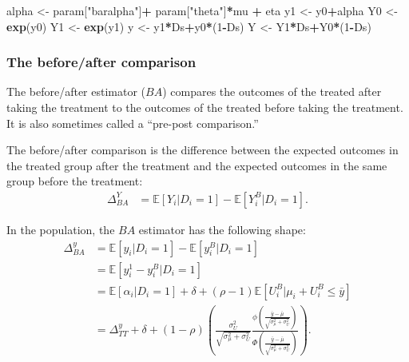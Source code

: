 \documentclass[]{book}
\newenvironment{Shaded}{\begin{snugshade}}{\end{snugshade}}
\newcommand{\DecValTok}[1]{\textcolor[rgb]{0.00,0.00,0.81}{#1}}
\newcommand{\KeywordTok}[1]{\textcolor[rgb]{0.13,0.29,0.53}{\textbf{#1}}}
\newcommand{\NormalTok}[1]{#1}
\newcommand{\OperatorTok}[1]{\textcolor[rgb]{0.81,0.36,0.00}{\textbf{#1}}}
\newcommand{\StringTok}[1]{\textcolor[rgb]{0.31,0.60,0.02}{#1}}
\newcommand{\esp}[1]{\mathbb{E}[ #1 ]}
\theoremstyle{definition}
\theoremstyle{definition}
\theoremstyle{definition}
\theoremstyle{remark}
\let\BeginKnitrBlock\begin \let\EndKnitrBlock\end
\begin{document}
\begin{Shaded}
\begin{Highlighting}[]
\NormalTok{alpha <-}\StringTok{ }\NormalTok{param[}\StringTok{"baralpha"}\NormalTok{]}\OperatorTok{+}\StringTok{  }\NormalTok{param[}\StringTok{"theta"}\NormalTok{]}\OperatorTok{*}\NormalTok{mu }\OperatorTok{+}\StringTok{ }\NormalTok{eta}
\NormalTok{y1 <-}\StringTok{ }\NormalTok{y0}\OperatorTok{+}\NormalTok{alpha}
\NormalTok{Y0 <-}\StringTok{ }\KeywordTok{exp}\NormalTok{(y0)}
\NormalTok{Y1 <-}\StringTok{ }\KeywordTok{exp}\NormalTok{(y1)}
\NormalTok{y <-}\StringTok{ }\NormalTok{y1}\OperatorTok{*}\NormalTok{Ds}\OperatorTok{+}\NormalTok{y0}\OperatorTok{*}\NormalTok{(}\DecValTok{1}\OperatorTok{-}\NormalTok{Ds)}
\NormalTok{Y <-}\StringTok{ }\NormalTok{Y1}\OperatorTok{*}\NormalTok{Ds}\OperatorTok{+}\NormalTok{Y0}\OperatorTok{*}\NormalTok{(}\DecValTok{1}\OperatorTok{-}\NormalTok{Ds)}
\end{Highlighting}
\end{Shaded}

\hypertarget{the-beforeafter-comparison}{%
\subsubsection{The before/after comparison}\label{the-beforeafter-comparison}}

The before/after estimator (\(BA\)) compares the outcomes of the treated after taking the treatment to the outcomes of the treated before taking the treatment.
It is also sometimes called a ``pre-post comparison.''

\BeginKnitrBlock{definition}[Before/after comparison]
\protect\hypertarget{def:unnamed-chunk-24}{}{\label{def:unnamed-chunk-24} \iffalse (Before/after comparison) \fi{} }The before/after comparison is the difference between the expected outcomes in the treated group after the treatment and the expected outcomes in the same group before the treatment:
\begin{align*}
\Delta^Y_{BA} & =  \esp{Y_i|D_i=1}-\esp{Y^B_i|D_i=1}.
\end{align*}
\EndKnitrBlock{definition}

\BeginKnitrBlock{example}
\protect\hypertarget{exm:unnamed-chunk-25}{}{\label{exm:unnamed-chunk-25} }In the population, the \(BA\) estimator has the following shape:
\begin{align*}
  \Delta^y_{BA} & = \esp{y_i|D_i=1}-\esp{y^B_i|D_i=1}\\
                & = \esp{y^1_i-y^B_i|D_i=1}\\
                & = \esp{\alpha_i|D_i=1} + \delta + (\rho-1)\esp{U_i^B|\mu_i+U_i^B\leq\bar{y}}\\
                & = \Delta^y_{TT} + \delta + (1-\rho)\left(\frac{\sigma^2_{U}}{\sqrt{\sigma^2_{\mu}+\sigma^2_{U}}}\frac{\phi\left(\frac{\bar{y}-\bar{\mu}}{\sqrt{\sigma^2_{\mu}+\sigma^2_{U}}}\right)}{\Phi\left(\frac{\bar{y}-\bar{\mu}}{\sqrt{\sigma^2_{\mu}+\sigma^2_{U}}}\right)}\right).
\end{align*}
\EndKnitrBlock{example}
\end{document}
